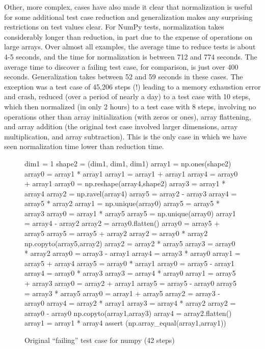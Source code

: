 Other, more complex, cases have also made it clear that normalization
is useful for some additional test case reduction and generalization
makes any surprising restrictions on test values clear.  For NumPy
tests, normalization takes considerably longer than reduction, in part
due to the expense of operations on large arrays.  Over almost all
examples, the average time to reduce tests is about 4-5 seconds, and
the time for normalization is between 712 and 774 seconds.  The
average time to discover a failing test case, for comparison, is just
over 400 seconds.  Generalization takes between 52 and 59 seconds in
these cases.  The exception was a test case of 45,206 steps (!)
leading to a memory exhaustion error and crash, reduced (over a period
of nearly a day) to a test case with 10 steps, which then normalized
(in only 2 hours) to a test case with 8 steps, involving no operations
other than array initialization (with zeros or ones), array
flattening, and array addition (the original test case involved larger
dimensions, array multiplication, and array subtraction).  This is the
only case in which we have seen normalization time lower than
reduction time.

\begin{figure}
{\scriptsize
\begin{code}
 dim1 = 1 
 shape2 = (dim1, dim1, dim1) 
 array1 = np.ones(shape2) 
 array0 = array1 * array1 
 array1 = array1 + array1 
 array4 = array0 + array1 
 array0 = np.reshape(array4,shape2) 
 array3 = array1 * array4 
 array2 = np.ravel(array4) 
 array5 = array2 - array3 
 array4 = array5 * array2 
 array1 = np.unique(array0) 
 array5 = array5 * array3 
 array0 = array1 * array5 
 array5 = np.unique(array0) 
 array1 = array4 - array2 
 array2 = array0.flatten() 
 array0 = array5 + array5 
 array5 = array5 + array2 
 array2 = array0 * array2 
 np.copyto(array5,array2) 
 array2 = array2 * array5 
 array3 = array0 * array2 
 array0 = array3 - array1 
 array4 = array3 * array0 
 array1 = array5 + array4 
 array5 = array0 * array1 
 array0 = array5 - array1 
 array4 = array0 * array3 
 array3 = array4 * array0 
 array1 = array5 + array3 
 array0 = array2 + array1 
 array5 = array5 - array0 
 array5 = array3 * array5 
 array0 = array1 + array5 
 array2 = array3 - array0 
 array4 = array2 * array1 
 array3 = array4 * array2 
 array2 = array0 - array0 
 np.copyto(array1,array3) 
 array4 = array2.flatten() 
 array1 = array1 * array4
 assert (np.array\_equal(array1,array1))
\end{code}
}
\caption{Original ``failing'' test case for numpy (42 steps)}
\label{numpyorig}
\end{figure}

